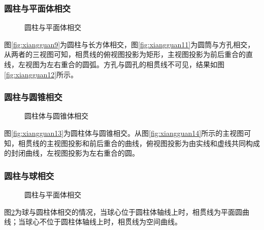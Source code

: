\subsubsection{圆柱与平面体相交}
 \begin{figure}[htbp]
 \centering
{}\hspace{10pt}
\hspace{10pt}
\hspace{10pt}
\caption{圆柱与平面体相交}\label{fig:xiangguannen}
\end{figure}
图\ref{fig:xiangguan9}为圆柱与长方体相交，图\ref{fig:xiangguan11}为圆筒与方孔相交，从两者的三视图可知，相贯线的俯视图投影为矩形，主视图投影为前后重合的直线，左视图为左右重合的圆弧。方孔与圆孔的相贯线不可见，结果如图\ref{fig:xiangguan12}所示。
\subsubsection{圆柱与圆锥相交}
 \begin{figure}[htbp]
 \centering
{}\hspace{60pt}
\caption{圆柱体与圆锥体相交}
\end{figure}
图\ref{fig:xiangguan13}为圆柱体与圆锥相交。从图\ref{fig:xiangguan14}所示的主视图可知，相贯线的主视图投影和前后重合的曲线，俯视图投影为由实线和虚线共同构成的封闭曲线，左视图投影为左右重合的圆。
\subsubsection{圆柱与球相交}
 \begin{figure}[htbp]
 \centering
{}\hspace{10pt}
\hspace{10pt}
\hspace{10pt}
\caption{圆柱与平面体相交}\label{fig:xiangguanqiu}
\end{figure}
图\ref{fig:xiangguanqiu}为球与圆柱体相交的情况，当球心位于圆柱体轴线上时，相贯线为平面圆曲线；当球心不位于圆柱体轴线上时，相贯线为空间曲线。
\endinput